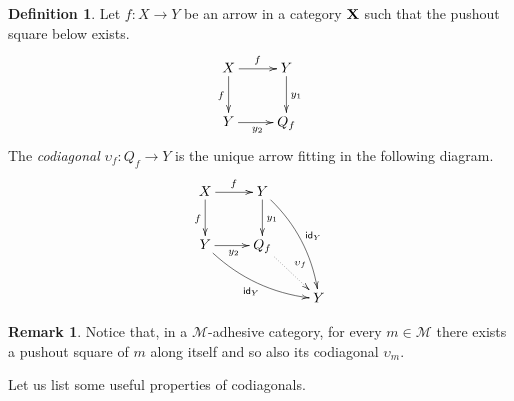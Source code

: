 \documentclass[a4paper]{article}
\newcommand{\id}[1]{\mathsf{id}_{#1}}
\def\X{\textbf {\textup{X}}}
\theoremstyle{definition}
\newtheorem{definition}[theorem]{Definition}
\newtheorem{remark}[theorem]{Remark}
\begin{document}
\begin{definition} 
	Let $f\colon X\to Y$ be an arrow in a category $\X$ such that the pushout square below  exists.
	\[\xymatrix{ X \ar[r]^f \ar[d]_f& Y \ar[d]^{y_1}\\ Y \ar[r]_{y_2} & Q_f}\]
	The \emph{codiagonal} $\upsilon_f\colon Q_f\to Y$ is the unique arrow  fitting in the following diagram.
	\[\xymatrix{ X \ar[r]^f \ar[d]_f& Y \ar@/^.3cm/[ddr]^{\id{Y}} \ar[d]^{y_1}\\ Y \ar@/_.3cm/[drr]_{\id{Y}}\ar[r]_{y_2} & Q_f \ar@{.>}[dr]^{\upsilon_f}\\ && Y}\]
\end{definition}

\begin{remark}\label{rem:cod}
	Notice that, in a  $\mathcal{M}$-adhesive category,  for every $m\in \mathcal{M}$ there exists a pushout square of $m$ along itself and so also its codiagonal $\upsilon_m$.
\end{remark}

Let us list some useful properties of codiagonals.
\end{document}
